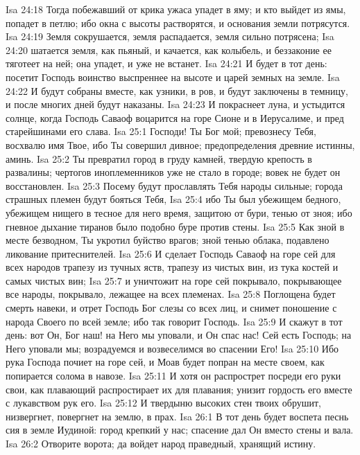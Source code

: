 \vs Isa 24:18 Тогда побежавший от крика ужаса упадет в яму; и кто выйдет из ямы, попадет в петлю; ибо окна с  высоты растворятся, и основания земли потрясутся.
\vs Isa 24:19 Земля сокрушается, земля распадается, земля сильно потрясена;
\vs Isa 24:20 шатается земля, как пьяный, и качается, как колыбель, и беззаконие ее тяготеет на ней; она упадет, и уже не встанет.
\rsbpar\vs Isa 24:21 И будет в тот день: посетит Господь воинство выспреннее на высоте и царей земных на земле.
\vs Isa 24:22 И будут собраны вместе, как узники, в ров, и будут заключены в темницу, и после многих дней будут наказаны.
\vs Isa 24:23 И покраснеет луна, и устыдится солнце, когда Господь Саваоф воцарится на горе Сионе и в Иерусалиме, и пред старейшинами его  слава.
\vs Isa 25:1 Господи! Ты Бог мой; превознесу Тебя, восхвалю имя Твое, ибо Ты совершил дивное; предопределения древние истинны, аминь.
\vs Isa 25:2 Ты превратил город в груду камней, твердую крепость в развалины; чертогов иноплеменников уже не стало в городе; вовек не будет он восстановлен.
\vs Isa 25:3 Посему будут прославлять Тебя народы сильные; города страшных племен будут бояться Тебя,
\vs Isa 25:4 ибо Ты был убежищем бедного, убежищем нищего в тесное для него время, защитою от бури, тенью от зноя; ибо гневное дыхание тиранов было подобно буре против стены.
\vs Isa 25:5 Как зной в месте безводном, Ты укротил буйство врагов;  зной тенью облака, подавлено ликование притеснителей.
\vs Isa 25:6 И сделает Господь Саваоф на горе сей для всех народов трапезу из тучных яств, трапезу из чистых вин, из тука костей и самых чистых вин;
\vs Isa 25:7 и уничтожит на горе сей покрывало, покрывающее все народы, покрывало, лежащее на всех племенах.
\vs Isa 25:8 Поглощена будет смерть навеки, и отрет Господь Бог слезы со всех лиц, и снимет поношение с народа Своего по всей земле; ибо так говорит Господь.
\vs Isa 25:9 И скажут в тот день: вот Он, Бог наш! на Него мы уповали, и Он спас нас! Сей есть Господь; на Него уповали мы; возрадуемся и возвеселимся во спасении Его!
\vs Isa 25:10 Ибо рука Господа почиет на горе сей, и Моав будет попран на месте своем, как попирается солома в навозе.
\vs Isa 25:11 И хотя он распрострет посреди его руки свои, как плавающий распростирает их для плавания;  унизит гордость его вместе с лукавством рук его.
\vs Isa 25:12 И твердыню высоких стен твоих обрушит, низвергнет, повергнет на землю, в прах.
\vs Isa 26:1 В тот день будет воспета песнь сия в земле Иудиной: город крепкий у нас; спасение дал Он вместо стены и вала.
\vs Isa 26:2 Отворите ворота; да войдет народ праведный, хранящий истину.
